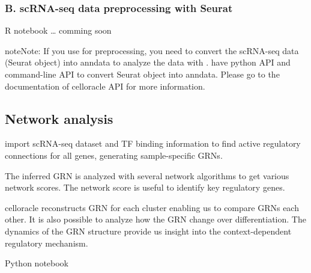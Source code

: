 \documentclass[letterpaper,10pt,english]{sphinxmanual}
\begin{document}
{
%
\begin{sphinxVerbatim}[commandchars=\\\{\}]
\llap{\color{nbsphinxin}[ ]:\,\hspace{\fboxrule}\hspace{\fboxsep}}
\end{sphinxVerbatim}
}


\subsubsection{B. scRNA-seq data preprocessing with Seurat}
\label{\detokenize{tutorials/scrnaprocess:b-scrna-seq-data-preprocessing-with-seurat}}
R notebook … comming soon

\begin{sphinxadmonition}{note}{Note:}
If you use  for preprocessing, you need to convert the scRNA-seq data (Seurat object) into anndata to analyze the data with .
 have python API and command-line API to convert Seurat object into anndata.
Please go to the documentation of celloracle API for more information.
\end{sphinxadmonition}


\subsection{Network analysis}
\label{\detokenize{tutorials/networkanalysis:network-analysis}}\label{\detokenize{tutorials/networkanalysis:networkanalysis}}\label{\detokenize{tutorials/networkanalysis::doc}}
 import scRNA-seq dataset and TF binding information to find active regulatory connections for all genes, generating sample-specific GRNs.

The inferred GRN is analyzed with several network algorithms to get various network scores. The network score is useful to identify key regulatory genes.

celloracle reconstructs GRN for each cluster enabling us to compare GRNs each other. It is also possible to analyze how the GRN change over differentiation.
The dynamics of the GRN structure provide us insight into the
context-dependent regulatory mechanism.

Python notebook
\end{document}
